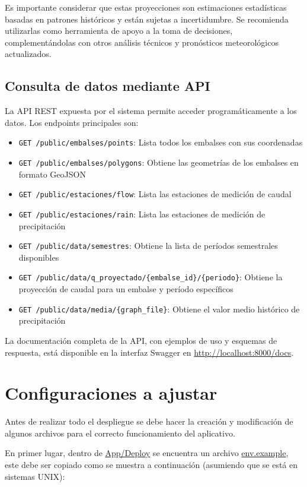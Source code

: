 Es importante considerar que estas proyecciones son estimaciones estadísticas basadas en patrones históricos y están sujetas a incertidumbre. Se recomienda utilizarlas como herramienta de apoyo a la toma de decisiones, complementándolas con otros análisis técnicos y pronósticos meteorológicos actualizados.

\subsection{Consulta de datos mediante API}
\label{subsec:chp7-4-4}

La API REST expuesta por el sistema permite acceder programáticamente a los datos. Los endpoints principales son:

\begin{itemize}
    \item \texttt{GET /public/embalses/points}: Lista todos los embalses con sus coordenadas
    \item \texttt{GET /public/embalses/polygons}: Obtiene las geometrías de los embalses en formato GeoJSON
    \item \texttt{GET /public/estaciones/flow}: Lista las estaciones de medición de caudal
    \item \texttt{GET /public/estaciones/rain}: Lista las estaciones de medición de precipitación
    \item \texttt{GET /public/data/semestres}: Obtiene la lista de períodos semestrales disponibles
    \item \texttt{GET /public/data/q\_proyectado/\{embalse\_id\}/\{periodo\}}: Obtiene la proyección de caudal para un embalse y período específicos
    \item \texttt{GET /public/data/media/\{graph\_file\}}: Obtiene el valor medio histórico de precipitación
\end{itemize}

La documentación completa de la API, con ejemplos de uso y esquemas de respuesta, está disponible en la interfaz Swagger en \url{http://localhost:8000/docs}.


\section{Configuraciones a ajustar}

Antes de realizar todo el despliegue se debe hacer la creación y modificación de algunos archivos para el correcto funcionamiento del aplicativo.

En primer lugar, dentro de \url{App/Deploy} se encuentra un archivo \url{env.example}, este debe ser copiado como se muestra a continuación (asumiendo que se está en sistemas UNIX):

